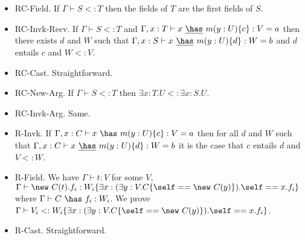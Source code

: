 \begin{itemize}
\item {\sc RC-Field}. If $\Gamma\vdash S<:T$ then the fields of $T$ are the first fields of $S$.
\item {\sc RC-Invk-Recv}. If $\Gamma\vdash S<:T$ and $\Gamma,x:T\vdash x~\underline\has~m(y:U)\{c\}:V=a$ then there exists $d$ and $W$ such that $\Gamma,x:S\vdash x~\underline\has~m(y:U)\{d\}:W=b$ and $d$ entails $c$ and $W<:V$.
\item {\sc RC-Cast}. Straightforward.
\item {\sc RC-New-Arg}. If $\Gamma\vdash S<:T$ then $\exists x:T.U<:\exists x:S.U$.
\item {\sc RC-Invk-Arg}. Same.
\item {\sc R-Invk}. If $\Gamma,x:C\vdash x~\has~m(y:U)\{c\}:V=a$ then for all $d$ and $W$ such that $\Gamma,x:C\vdash x~\underline\has~m(y:U)\{d\}:W=b$ it is the case that $c$ entails $d$ and $V<:W$.
\item {\sc R-Field}. We have $\Gamma\vdash t:V$ for some $V$, $\Gamma\vdash \new~C(t).f_i:W_i\{\exists x:(\exists y:V.C\{\self==\new~C(y)\}).\self==x.f_i\}$ where $\Gamma\vdash C~\has~f_i:W_i$. We prove $\Gamma\vdash V_i<:W_i\{\exists x:(\exists y:V.C\{\self==\new~C(y)\}).\self==x.f_i\}$.
\item {\sc R-Cast}. Straightforward.
\end{itemize}
